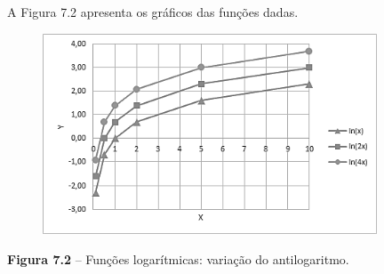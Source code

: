 \documentclass[12pt]{article}
\begin{document}
\vspace{\baselineskip}

\vspace{\baselineskip}

\vspace{\baselineskip}

\vspace{\baselineskip}

\vspace{\baselineskip}

\vspace{\baselineskip}

\vspace{\baselineskip}
\begin{adjustwidth}{0.75in}{0.0in}
A Figura 7.2 apresenta os gráficos das funções dadas.\par

\end{adjustwidth}


\vspace{\baselineskip}



\begin{figure}[H]
	\begin{Center}
		\includegraphics[width=3.92in,height=2.35in]{./media/image6.png}
	\end{Center}
\end{figure}



\par


\vspace{\baselineskip}
\begin{adjustwidth}{0.75in}{0.0in}
\textbf{Figura 7.2} – Funções logarítmicas: variação do antilogaritmo.\par

\end{adjustwidth}
\end{document}
